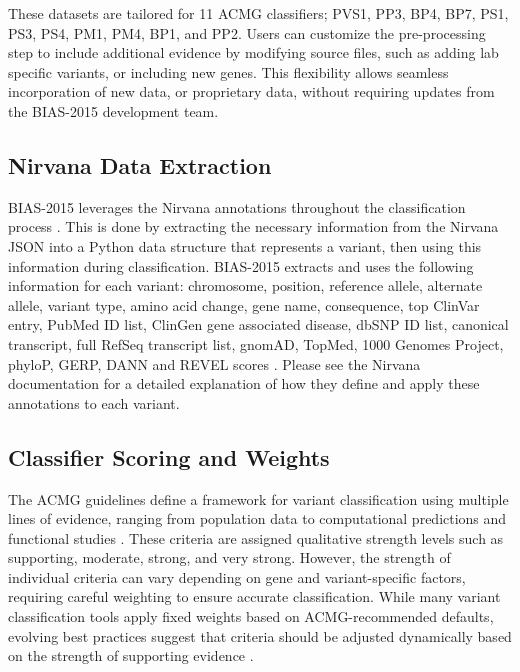 \documentclass[unnumsec,webpdf,contemporary,large]{oup-authoring-template}
\theoremstyle{thmstyleone}
\theoremstyle{thmstyletwo}
\theoremstyle{thmstylethree}
\begin{document}
These datasets are tailored for 11 ACMG classifiers; PVS1, PP3, BP4, BP7, PS1, PS3, PS4, PM1, PM4, BP1, and PP2. Users can customize the pre-processing step to include additional evidence by modifying source files, such as adding lab specific variants, or including new genes. This flexibility allows seamless incorporation of new data, or proprietary data, without requiring updates from the BIAS-2015 development team.

\subsection{Nirvana Data Extraction}
BIAS-2015 leverages the Nirvana annotations throughout the classification process \cite{stromberg2017nirvana}. This is done by extracting the necessary information from the Nirvana JSON into a Python data structure that represents a variant, then using this information during classification. BIAS-2015 extracts and uses the following information for each variant: chromosome, position, reference allele, alternate allele, variant type, amino acid change, gene name, consequence, top ClinVar entry, PubMed ID list, ClinGen gene associated disease, dbSNP ID list, canonical transcript, full RefSeq transcript list, gnomAD, TopMed, 1000 Genomes Project, phyloP, GERP, DANN and REVEL scores \cite{genomes2015global, davydov2010gerp, genomes2015global, ioannidis2016revel, karczewski2020mutational, landrum2018clinvar, quang2015dann, sherry1999dbsnp, pollard2010phyloP, kowalski2019topmed, strande2017clingen}. Please see the Nirvana documentation for a detailed explanation of how they define and apply these annotations to each variant.

\subsection{Classifier Scoring and Weights}
The ACMG guidelines define a framework for variant classification using multiple lines of evidence, ranging from population data to computational predictions and functional studies \cite{richards2015standards}. These criteria are assigned qualitative strength levels such as supporting, moderate, strong, and very strong. However, the strength of individual criteria can vary depending on gene and variant-specific factors, requiring careful weighting to ensure accurate classification. While many variant classification tools apply fixed weights based on ACMG-recommended defaults, evolving best practices suggest that criteria should be adjusted dynamically based on the strength of supporting evidence \cite{clingen2017recommendations}.
\end{document}
